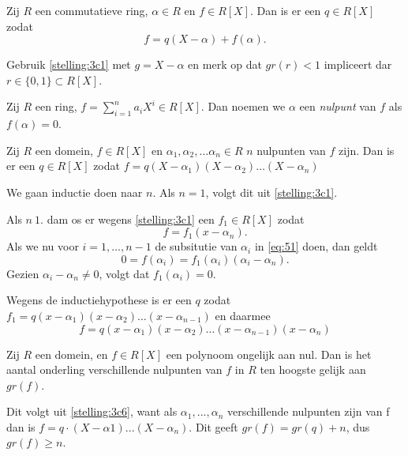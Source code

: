 \documentclass[a4paper,12pt,oneside]{book}
\begin{document}
\begin{stelling}
\label{stelling:3c5}
Zij $R$ een commutatieve ring, $\alpha \in R$ en $f\in R[X]$. Dan is er een $q \in R[X]$ zodat
$$ f = q(X-\alpha) + f(\alpha).$$
\end{stelling}

\begin{bewijs}

Gebruik \autoref{stelling:3c1} met $g = X -\alpha$ en merk op dat $gr(r) < 1$ impliceert dar $r \in \{0,1\} \subset R[X]$.
\end{bewijs}

\begin{definitie}
Zij $R$ een ring, $f  =\sum_{i=1}^n a_iX^i \in R[X]$. Dan noemen we $\alpha$ een \textit{nulpunt} van $f$ als $f(\alpha) = 0$.
\end{definitie}

\begin{stelling}
\label{stelling:3c6}
Zij $R$ een domein, $f\in R[X]$ en $\alpha_1, \alpha_2, \ldots \alpha_n \in R$ $n$ nulpunten van $f$ zijn. Dan is er een $q \in R[X]$ zodat $f = q(X-\alpha_1)(X-\alpha_2)\ldots (X-\alpha_n)$
\end{stelling}

\begin{bewijs}
We gaan inductie doen naar $n$. Als $n=1$, volgt dit uit \autoref{stelling:3c1}. 

Als $n \> 1$. dam os er wegens \autoref{stelling:3c1} een $f_1 \in R[X]$ zodat 
\begin{equation}
\label{eq:51}
f = f_1(x-\alpha_n).
\end{equation} Als we nu voor $i = 1,\ldots, n-1$ de subsitutie van $\alpha_i$ in \autoref{eq:51} doen, dan geldt
\[
0 = f(\alpha_i) = f_1(\alpha_i)(\alpha_i - \alpha_n).
\]
Gezien $\alpha_i - \alpha_n \ne 0$, volgt dat $f_1(\alpha_i) = 0$.

Wegens de inductiehypothese is er een $q$ zodat $f_1 = q(x-\alpha_1)(x-\alpha_2)\ldots(x-\alpha_{n-1})$
en daarmee
\[
f = q(x-\alpha_1)(x-\alpha_2)\ldots(x-\alpha_{n-1})(x-\alpha_{n})
\]
\end{bewijs}

\begin{stelling}
\label{stelling:3c7}
Zij $R$ een domein, en $f \in R[X]$ een polynoom ongelijk aan nul. Dan is het aantal
onderling verschillende nulpunten van $f$ in $R$ ten hoogste gelijk aan $gr(f )$.
\end{stelling}
\begin{bewijs}
 Dit volgt uit \autoref{stelling:3c6}, want als $\alpha_1 , . . . , \alpha_n$ verschillende nulpunten zijn van f dan is $f =
q \cdot (X - \alpha 1 ) . . . (X - \alpha_n )$. Dit geeft $gr(f ) = gr(q) + n$, dus $gr(f ) \ge n$.\end{bewijs}
\end{document}

